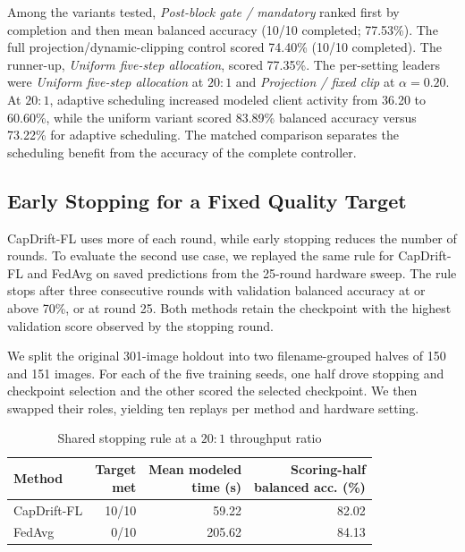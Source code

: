 \documentclass[conference]{IEEEtran}
\begin{document}
Among the variants tested, \emph{Post-block gate / mandatory} ranked first by completion and then mean balanced accuracy (10/10 completed; 77.53\%). The full projection/dynamic-clipping control scored 74.40\% (10/10 completed). The runner-up, \emph{Uniform five-step allocation}, scored 77.35\%. The per-setting leaders were \emph{Uniform five-step allocation} at $20{:}1$ and \emph{Projection / fixed clip} at $\alpha=0.20$. At $20{:}1$, adaptive scheduling increased modeled client activity from 36.20 to 60.60\%, while the uniform variant scored 83.89\% balanced accuracy versus 73.22\% for adaptive scheduling. The matched comparison separates the scheduling benefit from the accuracy of the complete controller.

\subsection{Early Stopping for a Fixed Quality Target}\label{subsec:early_stopping}
CapDrift-FL uses more of each round, while early stopping reduces the number of rounds. To evaluate the second use case, we replayed the same rule for CapDrift-FL and FedAvg on saved predictions from the 25-round hardware sweep. The rule stops after three consecutive rounds with validation balanced accuracy at or above 70\%, or at round 25. Both methods retain the checkpoint with the highest validation score observed by the stopping round.

We split the original 301-image holdout into two filename-grouped halves of 150 and 151 images. For each of the five training seeds, one half drove stopping and checkpoint selection and the other scored the selected checkpoint. We then swapped their roles, yielding ten replays per method and hardware setting.

\begin{table}[t]
\caption{Shared stopping rule at a $20{:}1$ throughput ratio}
\label{tab:early_stopping}
\centering\scriptsize
\setlength{\tabcolsep}{4pt}
\begin{tabular}{@{}lrrr@{}}
\toprule
Method & \shortstack{Target\\met} & \shortstack{Mean modeled\\time (s)} & \shortstack{Scoring-half\\balanced acc. (\%)}\\
\midrule
CapDrift-FL & 10/10 & 59.22 & 82.02\\
FedAvg & 0/10 & 205.62 & 84.13\\
\bottomrule
\end{tabular}
\end{table}
\end{document}
